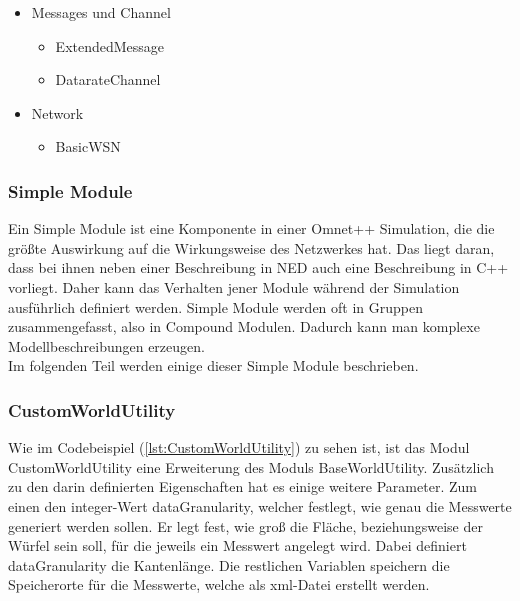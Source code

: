 \begin{itemize}{\label{enum:NedModules}}
\item Messages und Channel
\begin{multicols}{2}
\begin{itemize}
\item ExtendedMessage
\item DatarateChannel
\end{itemize}
\end{multicols}
\item Network
\begin{multicols}{2}
\begin{itemize}
\item BasicWSN
\end{itemize}
\end{multicols}
\end{itemize}


\subsubsection{Simple Module}

Ein Simple Module ist eine Komponente in einer Omnet++ Simulation, die die größte Auswirkung auf die Wirkungsweise des Netzwerkes hat. Das liegt daran, dass bei ihnen neben einer Beschreibung in NED auch eine Beschreibung in C++ vorliegt. Daher kann das Verhalten jener Module während der Simulation ausführlich definiert werden. Simple Module werden oft in Gruppen zusammengefasst, also in Compound Modulen. Dadurch kann man komplexe Modellbeschreibungen erzeugen.\\
Im folgenden Teil werden einige dieser Simple Module beschrieben.

\subsubsection{CustomWorldUtility}

Wie im Codebeispiel (\ref{lst:CustomWorldUtility}) zu sehen ist, ist das Modul CustomWorldUtility eine Erweiterung des Moduls BaseWorldUtility. Zusätzlich zu den darin definierten Eigenschaften hat es einige weitere Parameter. Zum einen den integer-Wert dataGranularity, welcher festlegt, wie genau die Messwerte generiert werden sollen. Er legt fest, wie groß die Fläche, beziehungsweise der Würfel sein soll, für die jeweils ein Messwert angelegt wird. Dabei definiert dataGranularity die Kantenlänge. Die restlichen Variablen speichern die Speicherorte für die Messwerte, welche als xml-Datei erstellt werden.


